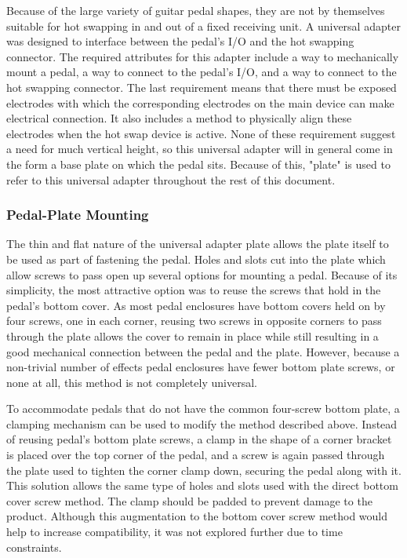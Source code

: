 

	Because of the large variety of guitar pedal shapes, they are not by themselves suitable for hot swapping in and out of a fixed receiving unit. A universal adapter was designed to interface between the pedal's I/O and the hot swapping connector.  The required attributes for this adapter include a way to mechanically mount a pedal, a way to connect to the pedal's I/O, and a way to connect to the hot swapping connector.  The last requirement means that there must be exposed electrodes with which the corresponding electrodes on the main device can make electrical connection.  It also includes a method to physically align these electrodes when the hot swap device is active.  None of these requirement suggest a need for much vertical height, so this universal adapter will in general come in the form a base plate on which the pedal sits.  Because of this, "plate" is used to refer to this universal adapter throughout the rest of this document.  

		\subsubsection{Pedal-Plate Mounting}

		The thin and flat nature of the universal adapter plate allows the plate itself to be used as part of fastening the pedal.  Holes and slots cut into the plate which allow screws to pass open up several options for mounting a pedal.  Because of its simplicity, the most attractive option was to reuse the screws that hold in the pedal's bottom cover.  As most pedal enclosures have bottom covers held on by four screws, one in each corner, reusing two screws in opposite corners to pass through the plate allows the cover to remain in place while still resulting in a good mechanical connection between the pedal and the plate.  However, because a non-trivial number of effects pedal enclosures have fewer bottom plate screws, or none at all, this method is not completely universal.

		To accommodate pedals that do not have the common four-screw bottom plate, a clamping mechanism can be used to modify the method described above.  Instead of reusing pedal's bottom plate screws, a clamp in the shape of a corner bracket is placed over the top corner of the pedal, and a screw is again passed through the plate used to tighten the corner clamp down, securing the pedal along with it.  This solution allows the same type of holes and slots used with the direct bottom cover screw method.  The clamp should be padded to prevent damage to the product.  Although this augmentation to the bottom cover screw method would help to increase compatibility, it was not explored further due to time constraints.

